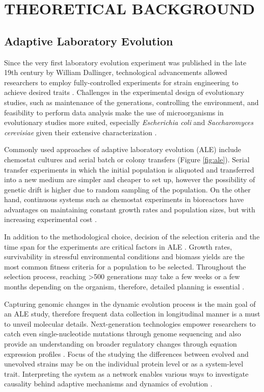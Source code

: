 \chapter{THEORETICAL BACKGROUND}

\section{Adaptive Laboratory Evolution}
Since the very first laboratory evolution experiment was published in the late 19th century by William Dallinger, technological advancements allowed researchers to employ fully-controlled experiments for strain engineering to achieve desired traits \cite{dragosits2013adaptive}. Challenges in the experimental design of evolutionary studies, such as maintenance of the generations, controlling the environment, and feasibility to perform data analysis make the use of microorganisms in evolutionary studies more suited, especially \emph{Escherichia coli} and \emph{Saccharomyces cerevisiae} given their extensive characterization \cite{mcdonald2019microbial}.

Commonly used approaches of adaptive laboratory evolution (ALE) include chemostat cultures and serial batch or colony transfers (Figure \ref{fig:ale}). Serial transfer experiments in which the initial population is aliquoted and transferred into a new medium are simpler and cheaper to set up, however the possibility of genetic drift is higher due to random sampling of the population. On the other hand, continuous systems such as chemostat experiments in bioreactors have advantages on maintaining constant growth rates and population sizes, but with increasing experimental cost \cite{winkler2013adaptive}.

In addition to the methodological choice, decision of the selection criteria and the time span for the experiments are critical factors in ALE \cite{dragosits2013adaptive}. Growth rates, survivability in stressful environmental conditions and biomass yields are the most common fitness criteria for a population to be selected. Throughout the selection process, reaching \textgreater 500 generations may take a few weeks or a few months depending on the organism, therefore, detailed planning is essential \cite{conrad2011microbial}.

Capturing genomic changes in the dynamic evolution process is the main goal of an ALE study, therefore frequent data collection in longitudinal manner is a must to unveil molecular details. Next-generation technologies empower researchers to catch even single-nucleotide mutations through genome sequencing and also provide an understanding on broader regulatory changes through equation expression profiles \cite{conrad2011microbial}. Focus of the studying the differences between evolved and unevolved strains may be on the individual protein level or as a system-level trait. Interpreting the system as a network enables various ways to investigate causality behind adaptive mechanisms and dynamics of evolution \cite{soyer2013evolutionary, long2018adaptive}.


